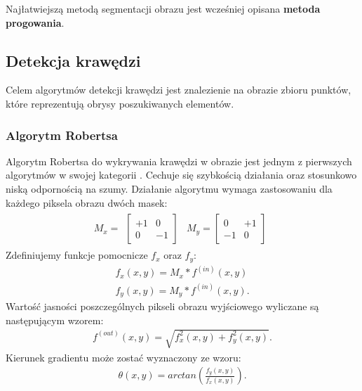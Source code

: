 Najłatwiejszą metodą segmentacji obrazu jest wcześniej opisana \textbf{metoda progowania}.
\subsection{Detekcja krawędzi}
Celem algorytmów detekcji krawędzi jest znalezienie na obrazie zbioru punktów, które reprezentują obrysy poszukiwanych elementów. 

\subsubsection{Algorytm Robertsa}
Algorytm Robertsa do wykrywania krawędzi w obrazie jest jednym z pierwszych algorytmów w swojej kategorii \cite{roberts63}. Cechuje się szybkością działania oraz stosunkowo niską odpornością na szumy. Działanie algorytmu wymaga zastosowaniu dla każdego piksela obrazu dwóch masek:
\begin{gather*}
  M_x = \begin{matrix}
    \begin{bmatrix}
      +1 & 0 \\
      0 & -1
    \end{bmatrix}
    &
    M_y = \begin{bmatrix}
      0 & +1 \\
      -1 & 0
    \end{bmatrix}
  \end{matrix}
\end{gather*}
Zdefiniujemy funkcje pomocnicze $f_x$ oraz $f_y$:
\begin{gather*}
  f_x(x, y) = M_x * f^{(in)}(x, y) \\
  f_y(x, y) = M_y * f^{(in)}(x, y).
\end{gather*}
Wartość jasności poszczególnych pikseli obrazu wyjściowego wyliczane są następującym wzorem:
\begin{gather*}
  f^{(out)}(x, y) = \sqrt{f_x^2(x, y)+f_{y}^2(x, y)}.
\end{gather*}
Kierunek gradientu może zostać wyznaczony ze wzoru:
\begin{gather*}
  \theta(x, y) = arctan(\frac{f_{y}(x, y)}{f_{x}(x, y)}).
\end{gather*}
